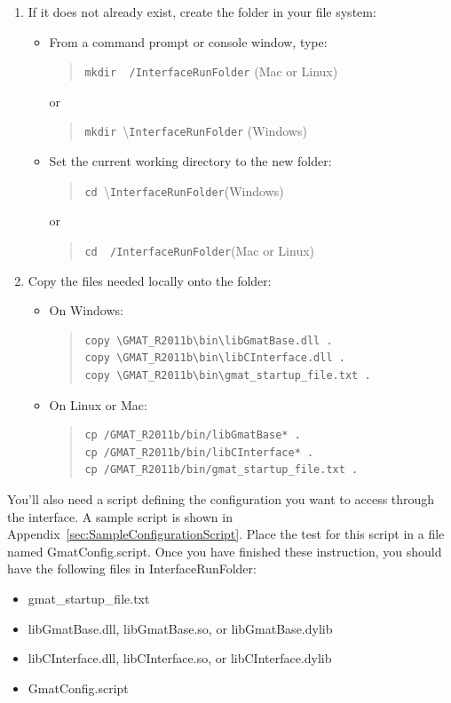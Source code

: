 \documentclass[letterpaper,10pt]{article}
\begin{document}
\begin{enumerate}
\item If it does not already exist, create the folder in your file system:
\begin{itemize}
\item From a command prompt or console window, type:
\begin{quote}
\texttt{mkdir ~/InterfaceRunFolder} \hfill (Mac or Linux)
\end{quote}
or
\begin{quote}
\texttt{mkdir }\textbackslash\texttt{InterfaceRunFolder} \hfill (Windows)
\end{quote} 
\item Set the current working directory to the new folder:
\begin{quote}
\texttt{cd }\textbackslash\texttt{InterfaceRunFolder}\hfill(Windows)
\end{quote} 
or
\begin{quote}
\texttt{cd ~/InterfaceRunFolder}\hfill(Mac or Linux)
\end{quote} 
\end{itemize}
\item Copy the files needed locally onto the folder:
\begin{itemize}
\item On Windows:
\begin{quote}
\begin{verbatim}
copy \GMAT_R2011b\bin\libGmatBase.dll .
copy \GMAT_R2011b\bin\libCInterface.dll .
copy \GMAT_R2011b\bin\gmat_startup_file.txt .
\end{verbatim}
\end{quote} 
\item On Linux or Mac:
\begin{quote}
\begin{verbatim}
cp /GMAT_R2011b/bin/libGmatBase* .
cp /GMAT_R2011b/bin/libCInterface* .
cp /GMAT_R2011b/bin/gmat_startup_file.txt .
\end{verbatim}
\end{quote} 
\end{itemize}
\end{enumerate}

\noindent You'll also need a script defining the configuration you want to access through the interface.  A sample script is shown in Appendix~\ref{sec:SampleConfigurationScript}.  Place the test for this script in a file named GmatConfig.script.  Once you have finished these instruction, you should have the following files in InterfaceRunFolder:
\begin{itemize}
	\item gmat\_startup\_file.txt
	\item libGmatBase.dll, libGmatBase.so, or libGmatBase.dylib
	\item libCInterface.dll, libCInterface.so, or libCInterface.dylib
	\item GmatConfig.script
\end{itemize}
\end{document}
